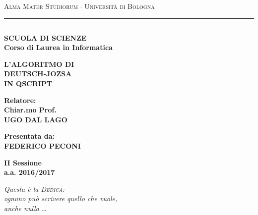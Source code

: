 \documentclass[12pt,a4paper,openright]{report}
\begin{document}
\textwidth=450pt\oddsidemargin=0pt
\begin{titlepage}
\begin{center}  
{{\Large{\textsc{Alma Mater Studiorum $\cdot$ Universit\`a di
Bologna}}}} \rule[0.1cm]{15.8cm}{0.1mm}
\rule[0.5cm]{15.8cm}{0.6mm}
{\small{\bf SCUOLA DI SCIENZE\\
Corso di Laurea in Informatica }}
\end{center}
\vspace{15mm}
\begin{center}
{\LARGE{\bf L'ALGORITMO DI}}\\
\vspace{3mm}
{\LARGE{\bf DEUTSCH-JOZSA}}\\
\vspace{3mm}
{\LARGE{\bf IN QSCRIPT}}\\
\end{center}
\vspace{40mm}
\par
\noindent
\begin{minipage}[t]{0.47\textwidth}
{\large{\bf Relatore:\\
Chiar.mo Prof.\\
UGO DAL LAGO}}
\end{minipage}
\hfill
\begin{minipage}[t]{0.47\textwidth}\raggedleft
{\large{\bf Presentata da:\\
FEDERICO PECONI}}
\end{minipage}
\vspace{20mm}
\begin{center}
{\large{\bf II Sessione\\%
a.a. 2016/2017 }}%
\end{center}
\newpage
\thispagestyle{empty}                   %
\topmargin=6.5cm                        %
\raggedleft                             %
\large                                  %
\em                                     %
Questa \`e la \textsc{Dedica}:\\
ognuno pu\`o scrivere quello che vuole, \\
anche nulla \ldots                      %
\newpage                                %
%
\clearpage{\pagestyle{empty}\cleardoublepage}%
\end{titlepage}
\tableofcontents
\end{document}
